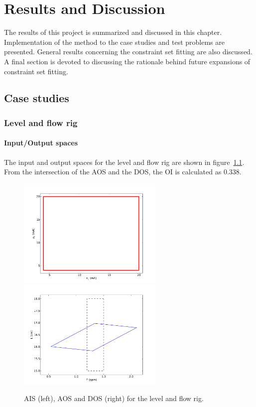 \chapter{Results and Discussion}\label{chap:results}
\begin{overview}
  The results of this project is summarized and discussed in this chapter.
  Implementation of the method to the case studies and test problems are presented.
  General results concerning the constraint set fitting are also discussed.
  A final section is devoted to discussing the rationale behind future expansions of constraint set fitting.
\end{overview}

\section{Case studies}
\subsection{Level and flow rig}
\subsubsection{Input/Output spaces}
The input and output spaces for the level and flow rig are shown in figure~\ref{fig:flowaisaos}.
From the intersection of the AOS and the DOS, the OI is calculated as 0.338.

\begin{figure}[htbp]
  \centering
    \includegraphics[width=7cm]{graph/flowais.pdf}
    \qquad
    \includegraphics[width=7cm]{graph/flowaos.pdf}
  \caption[AIS, AOS and DOS of the level and flow rig]{AIS (left), AOS and DOS (right) for the level and flow rig.}
  \label{fig:flowaisaos}
\end{figure}

